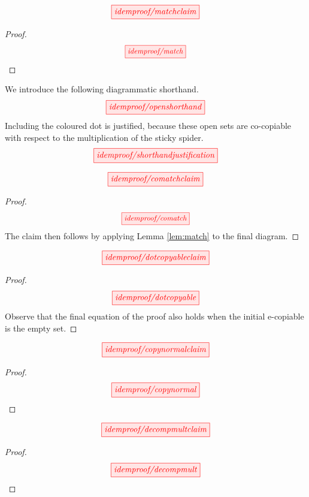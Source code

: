 \begin{fullwidth}

\begin{lemma}\label{lem:match}
\[\scalebox{1}{\tikzfig{idemproof/matchclaim}}\]
\begin{proof}
\[\scalebox{0.9}{\tikzfig{idemproof/match}}\]
\end{proof}
\end{lemma}

\begin{convention}
We introduce the following diagrammatic shorthand.
\[\scalebox{1}{\tikzfig{idemproof/openshorthand}}\]
Including the coloured dot is justified, because these open sets are co-copiable with respect to the multiplication of the sticky spider.
\[\scalebox{1}{\tikzfig{idemproof/shorthandjustification}}\]
\end{convention}

\begin{lemma}[Co-match]\label{lem:comatch}
\[\scalebox{1}{\tikzfig{idemproof/comatchclaim}}\]
\begin{proof}
\[\scalebox{0.9}{\tikzfig{idemproof/comatch}}\]
The claim then follows by applying Lemma \ref{lem:match} to the final diagram.
\end{proof}
\end{lemma}

\begin{lemma}\label{lem:ecopyfixpoint}
\[\scalebox{1}{\tikzfig{idemproof/dotcopyableclaim}}\]
\begin{proof}
\[\scalebox{1}{\tikzfig{idemproof/dotcopyable}}\]
Observe that the final equation of the proof also holds when the initial e-copiable is the empty set.
\end{proof}
\end{lemma}

\begin{lemma}\label{lem:ecopynormal}
\[\scalebox{1}{\tikzfig{idemproof/copynormalclaim}}\]
\begin{proof}
\[\scalebox{1}{\tikzfig{idemproof/copynormal}}\]
\end{proof}
\end{lemma}
{}
\begin{proposition}\label{prop:decompmult}
\[\scalebox{1}{\tikzfig{idemproof/decompmultclaim}}\]
\begin{proof}
\[\scalebox{1}{\tikzfig{idemproof/decompmult}}\]
\end{proof}
\end{proposition}


\end{fullwidth}
